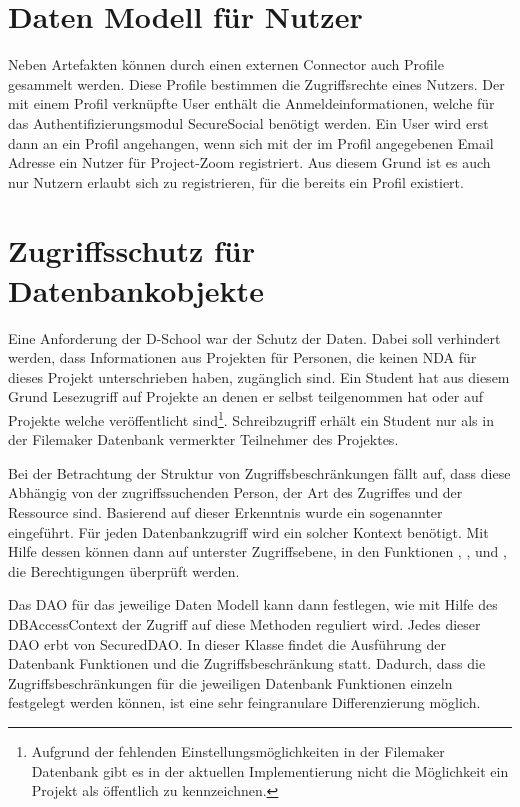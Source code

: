 \section{Daten Modell für Nutzer}

Neben Artefakten können durch einen externen Connector auch Profile gesammelt werden. Diese Profile bestimmen die Zugriffsrechte eines Nutzers. Der mit einem Profil verknüpfte User enthält die Anmeldeinformationen, welche für das Authentifizierungsmodul SecureSocial benötigt werden. Ein User wird erst dann an ein Profil angehangen, wenn sich mit der im Profil angegebenen Email Adresse ein Nutzer für Project-Zoom registriert. Aus diesem Grund ist es auch nur Nutzern erlaubt sich zu registrieren, für die bereits ein Profil existiert.

\section{Zugriffsschutz für Datenbankobjekte}

Eine Anforderung der D-School war der Schutz der Daten. Dabei soll verhindert werden, dass Informationen aus Projekten für Personen, die keinen NDA für dieses Projekt unterschrieben haben, zugänglich sind. Ein Student hat aus diesem Grund Lesezugriff auf Projekte an denen er selbst teilgenommen hat oder auf Projekte welche veröffentlicht sind\footnote{Aufgrund der fehlenden Einstellungsmöglichkeiten in der Filemaker Datenbank gibt es in der aktuellen Implementierung nicht die Möglichkeit ein Projekt als öffentlich zu kennzeichnen.}. Schreibzugriff erhält ein Student nur als in der Filemaker Datenbank vermerkter Teilnehmer des Projektes.

Bei der Betrachtung der Struktur von Zugriffsbeschränkungen fällt auf, dass diese Abhängig von der zugriffssuchenden Person, der Art des Zugriffes und der Ressource sind. Basierend auf dieser Erkenntnis wurde ein sogenannter  eingeführt. Für jeden Datenbankzugriff wird ein solcher Kontext benötigt. Mit Hilfe dessen können dann auf unterster Zugriffsebene, in den Funktionen , ,  und , die Berechtigungen überprüft werden.

Das DAO für das jeweilige Daten Modell kann dann festlegen, wie mit Hilfe des DBAccessContext der Zugriff auf diese Methoden reguliert wird. Jedes dieser DAO erbt von SecuredDAO. In dieser Klasse findet die Ausführung der Datenbank Funktionen und die Zugriffsbeschränkung statt. Dadurch, dass die Zugriffsbeschränkungen für die jeweiligen Datenbank Funktionen einzeln festgelegt werden können, ist eine sehr feingranulare Differenzierung möglich.

